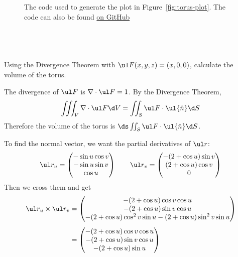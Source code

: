 \documentclass[a4paper]{article}
\begin{document}
\begin{figure}[h]
	\centering
	\inputminted{python}{./code/plot_torus.py}
	\caption{The code used to generate the plot in Figure~\ref{fig:torus-plot}. The code can also be found \href{https://github.com/DoctorDalek1963/uni/blob/9145bb837f02e16d45cf1807d5b1644ecd36a625/first-year/MA144-Methods-of-Mathematical-Modelling-2/Ass 4/code/plot_torus.py}{on GitHub}}
\end{figure}

\clearpage
\subsection{~} %

\begin{questionbody}
Using the Divergence Theorem with $\ul F(x, y, z) = (x, 0, 0)$, calculate the volume of the torus.
\end{questionbody}

The divergence of $\ul F$ is $\nabla \cdot \ul F = 1$. By the Divergence Theorem, $$\iiint_V \nabla \cdot \ul F \d V = \iint_S \ul F \cdot \ul{\hat n} \d S$$
Therefore the volume of the torus is $\ds \iint_S \ul F \cdot \ul{\hat n} \d S$.

To find the normal vector, we want the partial derivatives of $\ul r$: $$
\ul r_u = \begin{pmatrix} -\sin u \cos v \\ -\sin u \sin v \\ \cos u \end{pmatrix} \qquad
\ul r_v = \begin{pmatrix} -(2 + \cos u) \sin v \\ (2 + \cos u) \cos v \\ 0 \end{pmatrix}
$$
Then we cross them and get \begin{align*}
\ul r_u \times \ul r_v &= \begin{pmatrix} -(2 + \cos u) \cos v \cos u \\ -(2 + \cos u) \sin v \cos u \\ -(2 + \cos u) \cos^2 v \sin u - (2 + \cos u) \sin^2 v \sin u \end{pmatrix}\\[1ex]
&= \begin{pmatrix} -(2 + \cos u) \cos v \cos u \\ -(2 + \cos u) \sin v \cos u \\ -(2 + \cos u) \sin u \end{pmatrix}
\end{align*}
\end{document}
